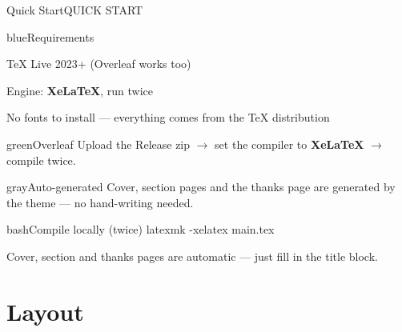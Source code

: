 \documentclass[10pt,aspectratio=169]{beamer}
\begin{document}
\begin{frame}[fragile]{Quick Start}{QUICK START}
  \begin{minipage}[t]{0.475\textwidth}
    \vspace{0pt}%
    \begin{cuhkbox}{blue}{Requirements}
      {\footnotesize
      \begin{denseitem}
        \item TeX Live 2023+ (Overleaf works too)
        \item Engine: \textbf{XeLaTeX}, run twice
        \item No fonts to install --- everything
              comes from the TeX distribution
      \end{denseitem}}
    \end{cuhkbox}
  \end{minipage}\hfill
  \begin{minipage}[t]{0.475\textwidth}
    \vspace{0pt}%
    \begin{cuhkbox}{green}{Overleaf}
      {\footnotesize Upload the Release zip
      $\rightarrow$ set the compiler to \textbf{XeLaTeX}
      $\rightarrow$ compile twice.}
    \end{cuhkbox}
    \begin{cuhkbox}{gray}{Auto-generated}
      {\footnotesize Cover, section pages and the thanks page
      are generated by the theme --- no hand-writing needed.}
    \end{cuhkbox}
  \end{minipage}
  \vspace{0.8mm}
  \begin{cuhkcode}{bash}{Compile locally (twice)}
latexmk -xelatex main.tex
  \end{cuhkcode}
  \begin{takeaway}
    Cover, section and thanks pages are automatic --- just fill in the title block.
  \end{takeaway}
\end{frame}

\section{Layout}
\end{document}
